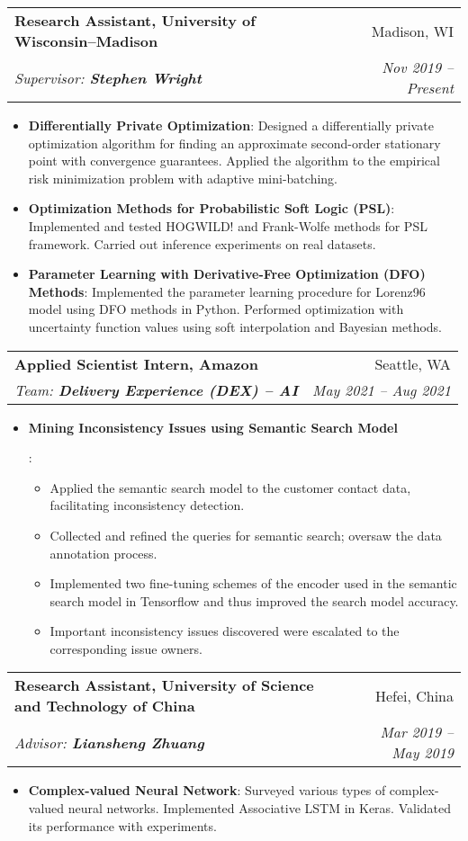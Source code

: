 \documentclass[letterpaper,12pt]{article}
\makeatletter
\newcommand{\resumeItem}[2]{
  \item\small{
    \textbf{#1}{: #2 \vspace{-2pt}}
  }
}
\newcommand{\resumeSubheading}[4]{
  \vspace{-1pt}\item
    \begin{tabular*}{0.97\textwidth}[t]{l@{\extracolsep{\fill}}r}
      \textbf{#1} & #2 \\
      \textit{\small#3} & \textit{\small #4} \\
    \end{tabular*}\vspace{-5pt}
}
\newcommand{\resumeItemListStart}{\begin{itemize}}
\newcommand{\resumeItemListEnd}{\end{itemize}\vspace{-5pt}}
\makeatother
\begin{document}
\resumeSubheading
{Research Assistant, University of Wisconsin--Madison}{Madison, WI}
{Supervisor: \textup{\textbf{Stephen Wright}}}{Nov 2019 -- Present}
\resumeItemListStart
\resumeItem{Differentially Private Optimization}
{Designed a differentially private optimization algorithm for finding an approximate second-order stationary point with convergence guarantees. Applied the algorithm to the empirical risk minimization problem with adaptive mini-batching.}
\resumeItem{Optimization Methods for Probabilistic Soft Logic (PSL)}
{Implemented and tested HOGWILD! and Frank-Wolfe methods for PSL framework. Carried out inference experiments on real datasets.}
\resumeItem{Parameter Learning with Derivative-Free Optimization (DFO) Methods}
{Implemented the parameter learning procedure for Lorenz96 model using DFO methods in Python. Performed optimization with uncertainty function values using soft interpolation and Bayesian methods.}
\resumeItemListEnd


\resumeSubheading {Applied Scientist Intern, Amazon}{Seattle, WA}
{Team: \textup{\textbf{Delivery Experience (DEX) -- AI}}}{May 2021 -- Aug 2021}
\resumeItemListStart
\resumeItem{Mining Inconsistency Issues using Semantic Search Model}{
  \begin{itemize}
    \item Applied the semantic search model to the customer contact data, facilitating inconsistency detection.
    \item Collected and refined the queries for semantic search; oversaw the data annotation process.
    \item Implemented two fine-tuning schemes of the encoder used in the semantic search model in Tensorflow and thus improved the search model accuracy.
    \item Important inconsistency issues discovered were escalated to the corresponding issue owners.
  \end{itemize}
}
\resumeItemListEnd

\resumeSubheading
{Research Assistant, University of Science and Technology of China}{Hefei, China}
{Advisor: \textup{\textbf{Liansheng Zhuang}}}{Mar 2019 -- May 2019}
\resumeItemListStart
\resumeItem{Complex-valued Neural Network}
{Surveyed various types of complex-valued neural networks. Implemented Associative LSTM in Keras. Validated its performance with experiments.}
\resumeItemListEnd
\end{document}
